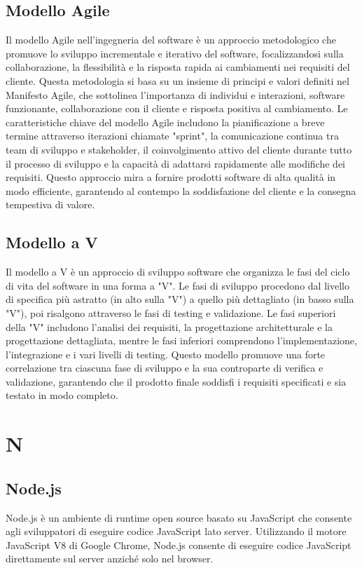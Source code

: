 \documentclass{article}
\begin{document}
\subsection{Modello Agile}
Il modello Agile nell'ingegneria del software è un approccio metodologico che promuove lo sviluppo incrementale e iterativo del software, focalizzandosi sulla collaborazione, la flessibilità e la risposta rapida ai cambiamenti nei requisiti del cliente. Questa metodologia si basa su un insieme di principi e valori definiti nel Manifesto Agile, che sottolinea l'importanza di individui e interazioni, software funzionante, collaborazione con il cliente e risposta positiva al cambiamento. Le caratteristiche chiave del modello Agile includono la pianificazione a breve termine attraverso iterazioni chiamate "sprint", la comunicazione continua tra team di sviluppo e stakeholder, il coinvolgimento attivo del cliente durante tutto il processo di sviluppo e la capacità di adattarsi rapidamente alle modifiche dei requisiti. Questo approccio mira a fornire prodotti software di alta qualità in modo efficiente, garantendo al contempo la soddisfazione del cliente e la consegna tempestiva di valore.

\subsection{Modello a V}
Il modello a V è un approccio di sviluppo software che organizza le fasi del ciclo di vita del software in una forma a "V". Le fasi di sviluppo procedono dal livello di specifica più astratto (in alto sulla "V") a quello più dettagliato (in basso sulla "V"), poi risalgono attraverso le fasi di testing e validazione. Le fasi superiori della "V" includono l'analisi dei requisiti, la progettazione architetturale e la progettazione dettagliata, mentre le fasi inferiori comprendono l'implementazione, l'integrazione e i vari livelli di testing. Questo modello promuove una forte correlazione tra ciascuna fase di sviluppo e la sua controparte di verifica e validazione, garantendo che il prodotto finale soddisfi i requisiti specificati e sia testato in modo completo.

\section{N}
\subsection{Node.js}
Node.js è un ambiente di runtime open source basato su JavaScript che consente agli sviluppatori di eseguire codice JavaScript lato server. Utilizzando il motore JavaScript V8 di Google Chrome, Node.js consente di eseguire codice JavaScript direttamente sul server anziché solo nel browser.
\end{document}
